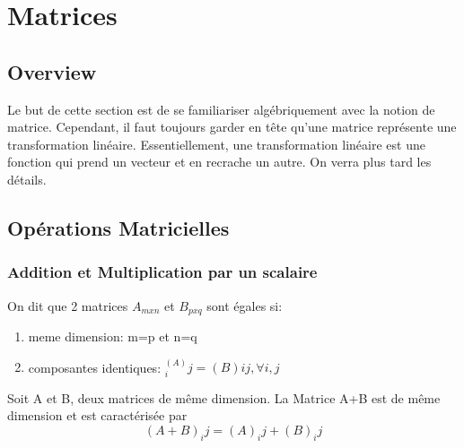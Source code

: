 \documentclass{article}
\begin{document}
\begin{remark}
\end{remark}

\pagebreak

\section{Matrices}
\subsection{Overview}

Le but de cette section est de se familiariser algébriquement avec la notion de
matrice. Cependant, il faut toujours garder en tête qu'une matrice représente
une transformation linéaire. Essentiellement, une transformation linéaire est
une fonction qui prend un vecteur et en recrache un autre. On verra plus tard
les détails.

\subsection{Opérations Matricielles}

\subsubsection{Addition et Multiplication par un scalaire}

\begin{definition}
    On dit que 2 matrices $A_{mxn}$ et $B_{pxq}$ sont égales si:
    \begin{enumerate}
	\item meme dimension: m=p et n=q
	\item composantes identiques: $^(A)_ij = (B)ij, \forall i,j$
    \end{enumerate}
\end{definition}

\begin{definition}
    Soit A et B, deux matrices de même dimension. La Matrice A+B est
    de même dimension et est caractérisée par $$(A+B)_ij = (A)_ij + (B)_ij$$
\end{definition}

\begin{remark}

\end{remark}
\end{document}
